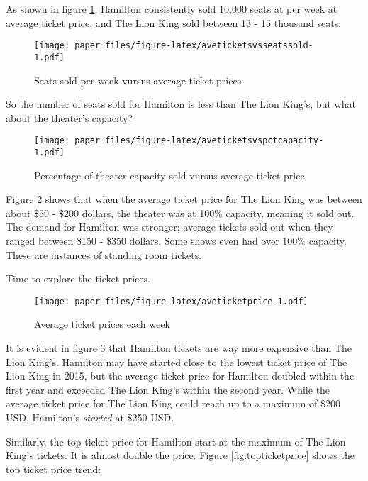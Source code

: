 \documentclass[
]{article}
\begin{document}
\newpage

As shown in figure \ref{fig:aveticketsvsseatssold}, Hamilton consistently sold 10,000 seats at per week at average ticket price, and The Lion King sold between 13 - 15 thousand seats:

\begin{figure}
\centering
\texttt{[image: paper\_files/figure-latex/aveticketsvsseatssold-1.pdf]}
\caption{\label{fig:aveticketsvsseatssold}Seats sold per week vursus average ticket prices}
\end{figure}

\newpage

So the number of seats sold for Hamilton is less than The Lion King's, but what about the theater's capacity?

\begin{figure}
\centering
\texttt{[image: paper\_files/figure-latex/aveticketsvspctcapacity-1.pdf]}
\caption{\label{fig:aveticketsvspctcapacity}Percentage of theater capacity sold vursus average ticket price}
\end{figure}

Figure \ref{fig:aveticketsvspctcapacity} shows that when the average ticket price for The Lion King was between about \$50 - \$200 dollars, the theater was at 100\% capacity, meaning it sold out. The demand for Hamilton was stronger; average tickets sold out when they ranged between \$150 - \$350 dollars. Some shows even had over 100\% capacity. These are instances of standing room tickets.

\newpage

Time to explore the ticket prices.

\begin{figure}
\centering
\texttt{[image: paper\_files/figure-latex/aveticketprice-1.pdf]}
\caption{\label{fig:aveticketprice}Average ticket prices each week}
\end{figure}

It is evident in figure \ref{fig:aveticketprice} that Hamilton tickets are way more expensive than The Lion King's. Hamilton may have started close to the lowest ticket price of The Lion King in 2015, but the average ticket price for Hamilton doubled within the first year and exceeded The Lion King's within the second year. While the average ticket price for The Lion King could reach up to a maximum of \$200 USD, Hamilton's \emph{started} at \$250 USD.

\newpage

Similarly, the top ticket price for Hamilton start at the maximum of The Lion King's tickets. It is almost double the price. Figure \ref{fig:topticketprice} shows the top ticket price trend:
\end{document}
